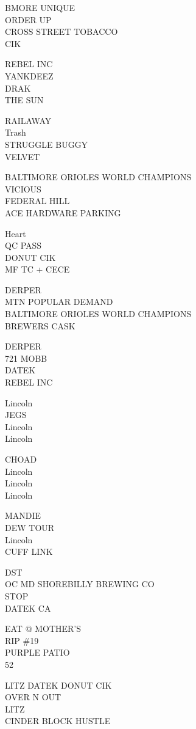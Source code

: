 \documentclass[10pt,letterpaper]{article}
\begin{document}
BMORE UNIQUE\\
ORDER UP\\
CROSS STREET TOBACCO\\
CIK

REBEL INC\\
YANKDEEZ\\
DRAK\\
THE SUN

RAILAWAY\\
Trash\\
STRUGGLE BUGGY\\
VELVET

BALTIMORE ORIOLES WORLD CHAMPIONS\\
VICIOUS\\
FEDERAL HILL\\
ACE HARDWARE PARKING

Heart\\
QC PASS\\
DONUT CIK\\
MF TC + CECE

DERPER\\
MTN POPULAR DEMAND\\
BALTIMORE ORIOLES WORLD CHAMPIONS\\
BREWERS CASK

DERPER\\
721 MOBB\\
DATEK\\
REBEL INC

Lincoln\\
JEGS\\
Lincoln\\
Lincoln

CHOAD\\
Lincoln\\
Lincoln\\
Lincoln

MANDIE\\
DEW TOUR\\
Lincoln\\
CUFF LINK

DST\\
OC MD SHOREBILLY BREWING CO\\
STOP\\
DATEK CA

EAT @ MOTHER'S\\
RIP \#19\\
PURPLE PATIO\\
52

LITZ DATEK DONUT CIK\\
OVER N OUT\\
LITZ\\
CINDER BLOCK HUSTLE
\end{document}

